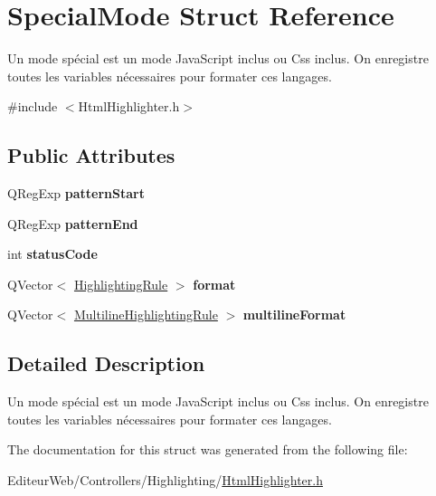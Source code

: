 \hypertarget{struct_special_mode}{
\section{SpecialMode Struct Reference}
\label{struct_special_mode}
}


Un mode spécial est un mode JavaScript inclus ou Css inclus. On enregistre toutes les variables nécessaires pour formater ces langages.  




{\ttfamily \#include $<$HtmlHighlighter.h$>$}

\subsection*{Public Attributes}
\begin{DoxyCompactItemize}
\item 
\hypertarget{struct_special_mode_abb44312d8468851c52c20039166aaf4d}{
QRegExp {\bfseries patternStart}}
\label{struct_special_mode_abb44312d8468851c52c20039166aaf4d}

\item 
\hypertarget{struct_special_mode_aea6676d8eacae1f092081354006161bf}{
QRegExp {\bfseries patternEnd}}
\label{struct_special_mode_aea6676d8eacae1f092081354006161bf}

\item 
\hypertarget{struct_special_mode_a7a2855c4c754dd763164308746363bd8}{
int {\bfseries statusCode}}
\label{struct_special_mode_a7a2855c4c754dd763164308746363bd8}

\item 
\hypertarget{struct_special_mode_a2c1fc3fa5cebd58504bbb015b662f6fc}{
QVector$<$ \hyperlink{struct_highlighting_rule}{HighlightingRule} $>$ {\bfseries format}}
\label{struct_special_mode_a2c1fc3fa5cebd58504bbb015b662f6fc}

\item 
\hypertarget{struct_special_mode_ae060af3f416941c88b9ec9866b71d0ad}{
QVector$<$ \hyperlink{struct_multiline_highlighting_rule}{MultilineHighlightingRule} $>$ {\bfseries multilineFormat}}
\label{struct_special_mode_ae060af3f416941c88b9ec9866b71d0ad}

\end{DoxyCompactItemize}


\subsection{Detailed Description}
Un mode spécial est un mode JavaScript inclus ou Css inclus. On enregistre toutes les variables nécessaires pour formater ces langages. 

The documentation for this struct was generated from the following file:\begin{DoxyCompactItemize}
\item 
EditeurWeb/Controllers/Highlighting/\hyperlink{_html_highlighter_8h}{HtmlHighlighter.h}\end{DoxyCompactItemize}
